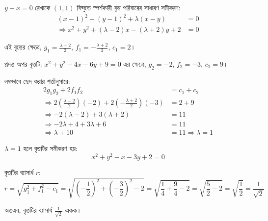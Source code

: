 \documentclass[12pt, a4paper]{article}
\begin{document}
\begin{tcolorbox}[solutionbox={সমাধান (Solution)}]
    \noindent
    $y - x = 0$ রেখাকে $(1, 1)$ বিন্দুতে স্পর্শকারী বৃত্ত পরিবারের সাধারণ সমীকরণ:
    \begin{align*}
        (x - 1)^2 + (y - 1)^2 + \lambda(x - y) &= 0 \\
        \Rightarrow x^2 + y^2 + (\lambda - 2)x - (\lambda + 2)y + 2 &= 0
    \end{align*}
    
    \vspace{0.5em}
    এই বৃত্তের ক্ষেত্রে, $g_1 = \frac{\lambda - 2}{2}$, $f_1 = -\frac{\lambda + 2}{2}$, $c_1 = 2$।
    
    \vspace{0.5em}
    প্রদত্ত অপর বৃত্তটি: $x^2 + y^2 - 4x - 6y + 9 = 0$ 
    এর ক্ষেত্রে, $g_2 = -2$, $f_2 = -3$, $c_2 = 9$।
    
    \vspace{0.5em}
    লম্বভাবে ছেদ করার শর্তানুসারে:
    \begin{align*}
        2g_1g_2 + 2f_1f_2 &= c_1 + c_2 \\
        \Rightarrow 2\left(\frac{\lambda - 2}{2}\right)(-2) + 2\left(-\frac{\lambda + 2}{2}\right)(-3) &= 2 + 9 \\
        \Rightarrow -2(\lambda - 2) + 3(\lambda + 2) &= 11 \\
        \Rightarrow -2\lambda + 4 + 3\lambda + 6 &= 11 \\
        \Rightarrow \lambda + 10 &= 11 \Rightarrow \lambda = 1
    \end{align*}
    
    \vspace{0.5em}
    $\lambda = 1$ হলে বৃত্তটির সমীকরণ হয়:
    \[ x^2 + y^2 - x - 3y + 2 = 0 \]
    
    \vspace{0.5em}
    বৃত্তটির ব্যাসার্ধ $r$:
    \[ r = \sqrt{g_1^2 + f_1^2 - c_1} = \sqrt{\left(-\frac{1}{2}\right)^2 + \left(-\frac{3}{2}\right)^2 - 2} = \sqrt{\frac{1}{4} + \frac{9}{4} - 2} = \sqrt{\frac{5}{2} - 2} = \sqrt{\frac{1}{2}} = \frac{1}{\sqrt{2}} \]
    
    \vspace{0.5em}
    অতএব, বৃত্তটির ব্যাসার্ধ $\frac{1}{\sqrt{2}}$ একক।
\end{tcolorbox}

\vspace{2em}
\end{document}
